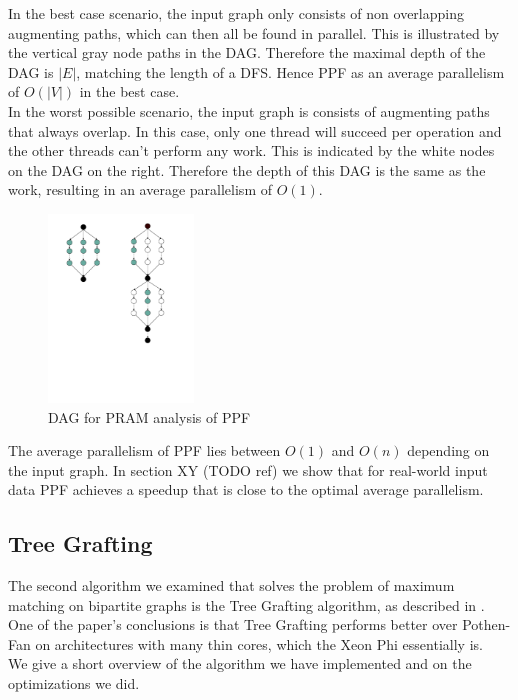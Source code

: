 \documentclass[letterpaper]{article}
\begin{document}
In the best case scenario, the input graph only consists of non overlapping augmenting paths, which can then all be found in parallel. This is illustrated by the vertical gray node paths in the DAG.
Therefore the maximal depth of the DAG is $|E|$, matching the length of a DFS. Hence PPF as an average parallelism of $O(|V|)$ in the best case.\\

In the worst possible scenario, the input graph is consists of augmenting paths that always overlap. In this case, only one thread will succeed per operation and the other threads can't perform any work. This is indicated by the white nodes on the DAG on the right. Therefore the depth of this DAG is the same as the work, resulting in an average parallelism of $O(1)$.\\

\begin{figure}
    \begin{center}
  \includegraphics[height=5cm, trim={2.5cm 8cm 4cm 1cm}, clip]{PRAM.pdf}
  \end{center}
  \caption{DAG for PRAM analysis of PPF}
  \label{fig:pram}
\end{figure}

The average parallelism of PPF lies between $O(1)$ and $O(n)$ depending on the input graph. 
In section XY (TODO ref) we show that for real-world input data PPF achieves a speedup that is close to the optimal average parallelism.

\subsection{Tree Grafting}\label{sec:tg}

The second algorithm we examined that solves the problem of maximum matching on bipartite graphs is the Tree Grafting algorithm, as described in \cite{Azad:2015}. One of the paper's conclusions is that Tree Grafting performs better over Pothen-Fan on architectures with many thin cores, which the Xeon Phi essentially is. \\
We give a short overview of the algorithm we have implemented and on the optimizations we did.
\end{document}
